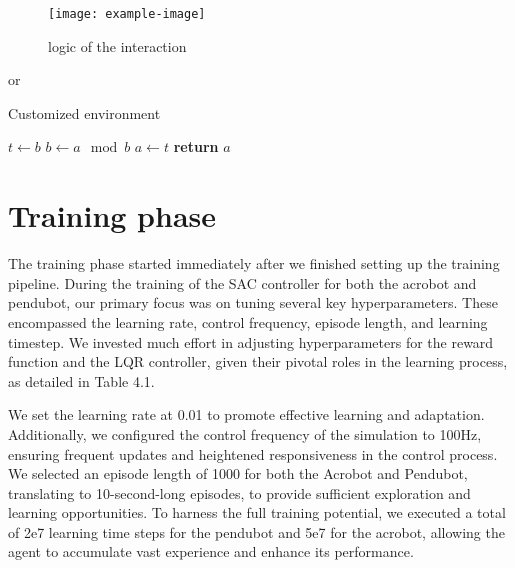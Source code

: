 \begin{figure}[H]
    \centering
    \texttt{[image: example-image]}
    \caption{logic of the interaction}
    \label{fig:my_label}
\end{figure}

or

\begin{algorithm}
\caption{Customized environment}
\begin{algorithmic}[1]
    \State $t \gets b$
    \State $b \gets a \mod b$
    \State $a \gets t$
\EndWhile
\State \textbf{return} $a$
\EndProcedure
\end{algorithmic}
\end{algorithm}

\section{Training phase}
The training phase started immediately after we finished setting up the training pipeline. During the training of the SAC controller for both the acrobot and pendubot, our primary focus was on tuning several key hyperparameters. These encompassed the learning rate, control frequency, episode length, and learning timestep. We invested much effort in adjusting hyperparameters for the reward function and the LQR controller, given their pivotal roles in the learning process, as detailed in Table 4.1.

We set the learning rate at 0.01 to promote effective learning and adaptation. Additionally, we configured the control frequency of the simulation to 100Hz, ensuring frequent updates and heightened responsiveness in the control process. We selected an episode length of 1000 for both the Acrobot and Pendubot, translating to 10-second-long episodes, to provide sufficient exploration and learning opportunities. To harness the full training potential, we executed a total of 2e7 learning time steps for the pendubot and 5e7 for the acrobot, allowing the agent to accumulate vast experience and enhance its performance.


